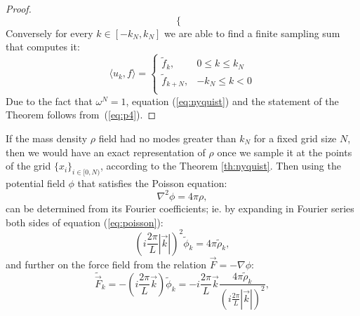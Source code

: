 \begin{proof}
\begin{equation}
\begin{cases}
        \end{cases}
    \end{equation}
    Conversely for every $k\in[-k_N,k_N]$ we are able to find 
    a finite sampling sum that computes it:
    \begin{equation}
        \langle u_k, f \rangle
        = 
        \begin{cases}
            \tilde f_k, & 0\le k \le k_N \\
            \tilde f_{k+N}, & - k_N\le k < 0 \\
        \end{cases}
        \label{eq:p4}
    \end{equation}
    Due to the fact that $\omega^{N}=1$, equation (\ref{eq:nyquist})
    and the statement of the Theorem follows from~(\ref{eq:p4}).
\end{proof}

If the mass density $\rho$ field had no modes greater than $k_N$
for a fixed grid size $N$, then we would have an exact representation
of $\rho$ once we sample it at the points of the grid $\{ x_i \}_{i\in[0,N)}$,
according to the Theorem \ref{th:nyquist}.
Then using the potential field $\phi$ that satisfies
the Poisson equation:
\begin{equation}
    \nabla^2 \phi = 4\pi\rho,
    \label{eq:poisson}
\end{equation}
can be determined from its Fourier coefficients; ie. by expanding
in Fourier series both sides of equation (\ref{eq:poisson}):
\begin{equation}
    \left(i \frac{2\pi}{L} |\vec k| \right)^2\tilde\phi_k = 4\pi \tilde\rho_k,
\end{equation}
and further on the force field from the relation $\vec F = -\nabla \phi$:
\begin{equation}
    \tilde {\vec F}_k = -\left(i \frac{2\pi}{L} \vec k \right)\tilde\phi_k
     = - i \frac{2\pi}{L} \vec k\frac{4\pi\tilde\rho_k}{\left(i \frac{2\pi}{L} |\vec k| \right)^2},
\end{equation}

